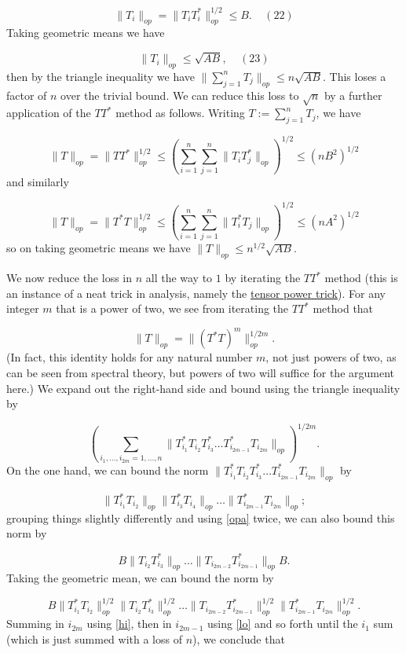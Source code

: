 \documentclass[11pt]{article}
\theoremstyle{definition}
\theoremstyle{remark}
\begin{document}
\[\displaystyle  \|T_i\|_{op} = \| T_i T_i^* \|_{op}^{1/2} \leq B. \ \ \ \ \ (22)\]
 Taking geometric means we have \label{tia}

\[\displaystyle  \|T_i\|_{op} \leq \sqrt{AB}, \ \ \ \ \ (23)\]
 then by the triangle inequality we have \({\|\sum_{j=1}^n T_j \|_{op} \leq n \sqrt{AB}}\). This loses a factor of \({n}\) over the trivial bound. We can reduce this loss to \({\sqrt{n}}\) by a further application of the \({TT^*}\) method as follows. Writing \({T := \sum_{j=1}^n T_j}\), we have 

\[\displaystyle  \| T \|_{op} = \| TT^* \|_{op}^{1/2} \leq (\sum_{i=1}^n \sum_{j=1}^n \| T_i T_j^* \|_{op})^{1/2} \leq (nB^2)^{1/2}\]
 and similarly 

\[\displaystyle  \| T \|_{op} = \| T^*T \|_{op}^{1/2} \leq (\sum_{i=1}^n \sum_{j=1}^n \| T_i^* T_j \|_{op})^{1/2} \leq (nA^2)^{1/2}\]
 so on taking geometric means we have \({\|T\|_{op} \leq n^{1/2} \sqrt{AB}}\). 


We now reduce the loss in \({n}\) all the way to \({1}\) by iterating the \({TT^*}\) method (this is an instance of a neat trick in analysis, namely the \href{https://terrytao.wordpress.com/2008/08/25/tricks-wiki-article-the-tensor-product-trick/}{tensor power trick}). For any integer \({m}\) that is a power of two, we see from iterating the \({TT^*}\) method that 

\[\displaystyle  \| T \|_{op} = \| (T^* T)^m \|_{op}^{1/2m}.\]
 (In fact, this identity holds for any natural number \({m}\), not just powers of two, as can be seen from spectral theory, but powers of two will suffice for the argument here.) We expand out the right-hand side and bound using the triangle inequality by 

\[\displaystyle  (\sum_{i_1,\dots,i_{2m} = 1,\dots,n} \| T^*_{i_1} T_{i_2} T^*_{i_3} \dots T^*_{i_{2m-1}} T_{i_{2m}} \|_{op})^{1/2m}.\]
 On the one hand, we can bound the norm \({\| T^*_{i_1} T_{i_2} T^*_{i_3} \dots T^*_{i_{2m-1}} T_{i_{2m}} \|_{op}}\) by 

\[\displaystyle  \| T^*_{i_1} T_{i_2} \|_{op} \| T^*_{i_3} T_{i_4} \|_{op} \dots \| T^*_{i_{2m-1}} T_{i_{2m}} \|_{op};\]
 grouping things slightly differently and using \eqref{opa} twice, we can also bound this norm by 

\[\displaystyle  B \| T_{i_2} T^*_{i_3} \|_{op} \dots \| T_{i_{2m-2}} T^*_{i_{2m-1}} \|_{op} B.\]
 Taking the geometric mean, we can bound the norm by 

\[\displaystyle B \| T^*_{i_1} T_{i_2} \|_{op}^{1/2} \| T_{i_2} T^*_{i_3} \|_{op}^{1/2} \dots \| T_{i_{2m-2}} T^*_{i_{2m-1}} \|_{op}^{1/2} \| T^*_{i_{2m-1}} T_{i_{2m}} \|_{op}^{1/2}.\]
 Summing in \({i_{2m}}\) using \eqref{hi}, then in \({i_{2m-1}}\) using \eqref{lo} and so forth until the \({i_1}\) sum (which is just summed with a loss of \({n}\)), we conclude that 
\end{document}
